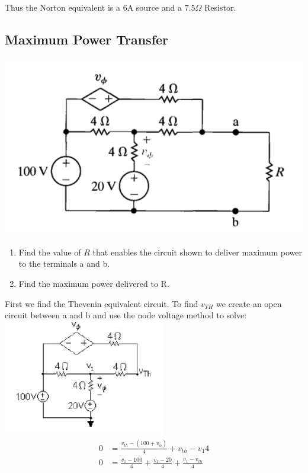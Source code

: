 Thus the Norton equivalent is a 6A source and a $7.5\Omega$ Resistor. 

\subsection {Maximum Power Transfer}

\includegraphics[scale=0.5]{img/c4/p5} \\
\begin{enumerate}
	\item Find the value of $R$ that enables the circuit shown to deliver maximum power
	to the terminals a and b.
	\item Find the maximum power delivered to R. 
\end{enumerate}

First we find the Thevenin equivalent circuit. To find $v_{TH}$ we create an open circuit
between a and b and use the node voltage method to solve: \\
\includegraphics{img/c4/a51} \\
\begin{align*}
	0 &= \frac{v_{th} - (100 + v_{\phi})}{4} + {v_{th} - v_1}{4} \\
	0 &= \frac{v_1 -100}{4} + \frac{v_1-20}{4} + \frac{v_1 -v_{th}}{4} \\
\end{align*}

